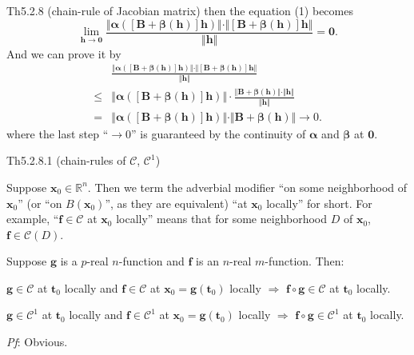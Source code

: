 \documentclass{article}
\begin{document}
\begin{Th}{Th5.2.8 (chain-rule of Jacobian matrix)}
    then the equation (1) becomes
    $$ \lim\limits_{\pmb{h}\to\pmb{0}}\frac{\Vert\pmb{\alpha}([\pmb{B} + \pmb{\beta}(\pmb{h})]\pmb{h})\Vert \cdot \Vert [\pmb{B} + \pmb{\beta}(\pmb{h})]\pmb{h}\Vert}{\Vert\pmb{h}\Vert} = \pmb{0}. $$
    And we can prove it by
    $$ 
    \begin{aligned}
        & \frac{\Vert\pmb{\alpha}([\pmb{B} + \pmb{\beta}(\pmb{h})]\pmb{h})\Vert \cdot \Vert [\pmb{B} + \pmb{\beta}(\pmb{h})]\pmb{h}\Vert}{\Vert\pmb{h}\Vert} \\
        \leq & \Vert\pmb{\alpha}([\pmb{B} + \pmb{\beta}(\pmb{h})]\pmb{h})\Vert \cdot \frac{\Vert \pmb{B} + \pmb{\beta}(\pmb{h})\Vert \cdot \Vert\pmb{h}\Vert}{\Vert\pmb{h}\Vert} \\
        = & \Vert\pmb{\alpha}([\pmb{B} + \pmb{\beta}(\pmb{h})]\pmb{h})\Vert \cdot \Vert \pmb{B} + \pmb{\beta}(\pmb{h})\Vert \rightarrow 0.
    \end{aligned}
    $$
    where the last step ``$\rightarrow 0$'' is guaranteed by the continuity of $\pmb{\alpha}$ and $\pmb{\beta}$ at $\pmb{0}$.
\end{Th}

\begin{Th}{Th5.2.8.1 (chain-rules of $\mathcal{C}$, $\mathcal{C}^1$)}
    \begin{compactenum}
        \item \textcolor{Df}{Suppose $\pmb{x}_0\in\mathbb{R}^n$. Then we term the adverbial modifier ``on some neighborhood of $\pmb{x}_0$'' (or ``on $B(\pmb{x}_0)$'', as they are equivalent) ``at $\pmb{x}_0$ locally'' for short.} For example, ``$\pmb{f}\in\mathcal{C}$ at $\pmb{x}_0$ locally'' means that for some neighborhood $D$ of $\pmb{x}_0$, $\pmb{f}\in\mathcal{C}(D)$.
        \item Suppose $\pmb{g}$ is a $p$-real $n$-function and $\pmb{f}$ is an $n$-real $m$-function. Then: \begin{compactenum}
            \item $\pmb{g}\in\mathcal{C}$ at $\pmb{t}_0$ locally and $\pmb{f}\in\mathcal{C}$ at $\pmb{x}_0 = \pmb{g}(\pmb{t}_0)$ locally $\Rightarrow$ $\pmb{f}\circ\pmb{g}\in\mathcal{C}$ at $\pmb{t}_0$ locally.
            \item $\pmb{g}\in\mathcal{C}^1$ at $\pmb{t}_0$ locally and $\pmb{f}\in\mathcal{C}^1$ at $\pmb{x}_0 = \pmb{g}(\pmb{t}_0)$ locally $\Rightarrow$ $\pmb{f}\circ\pmb{g}\in\mathcal{C}^1$ at $\pmb{t}_0$ locally.
        \end{compactenum}
    \end{compactenum}
    \tcblower
    \textit{Pf}: Obvious.
\end{Th}
\end{document}
